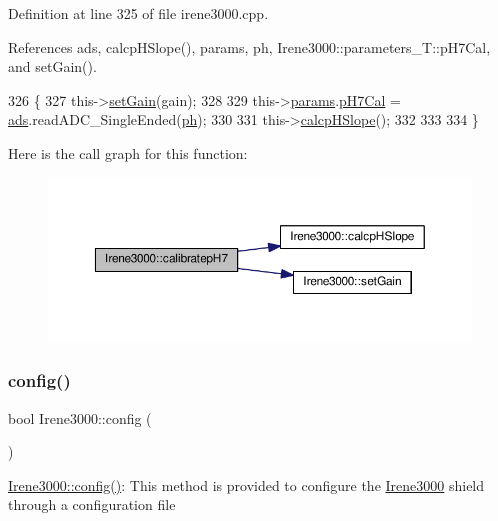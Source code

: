 Definition at line 325 of file irene3000.\+cpp.



References ads, calcp\+H\+Slope(), params, ph, Irene3000\+::parameters\+\_\+\+T\+::p\+H7\+Cal, and set\+Gain().


\begin{DoxyCode}
326 \{
327     this->\hyperlink{classIrene3000_aff7c5da186b388e7272e63ff88a20c34}{setGain}(gain);
328         
329     this->\hyperlink{classIrene3000_a136585a5ee7f9ac6ab52175fa153f8e3}{params}.\hyperlink{structIrene3000_1_1parameters__T_a21265466a570d84bff914f26d2f7a03e}{pH7Cal} = \hyperlink{classIrene3000_a1215e77ba761c9908d80d691f149e135}{ads}.readADC\_SingleEnded(\hyperlink{Irene3000_8h_af771ceafe0e6524dd8497d4305dfe778}{ph});
330  
331     this->\hyperlink{classIrene3000_a81f6a79e546679692053f7ac1af49613}{calcpHSlope}();
332 
333 
334 \}
\end{DoxyCode}
Here is the call graph for this function\+:\nopagebreak
\begin{figure}[H]
\begin{center}
\leavevmode
\includegraphics[width=350pt]{classIrene3000_a2e810ddfa8b95eaa2446a408761c6bdc_cgraph}
\end{center}
\end{figure}
\mbox{\label{classIrene3000_afed5c35e4b23963c157847ef27c11e9c}} 
\subsubsection{\texorpdfstring{config()}{config()}}
{\footnotesize\ttfamily bool Irene3000\+::config (\begin{DoxyParamCaption}{ }\end{DoxyParamCaption})}

\hyperlink{classIrene3000_afed5c35e4b23963c157847ef27c11e9c}{Irene3000\+::config()}\+: This method is provided to configure the \hyperlink{classIrene3000}{Irene3000} shield through a configuration file

